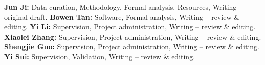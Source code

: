 \documentclass[pdflatex,iicol,sn-apa]{sn-jnl}
\theoremstyle{remark}
\begin{document}
\textbf{Jun Ji:} Data curation, Methodology, Formal analysis, Resources, Writing -- original draft.
\textbf{Bowen Tan:} Software, Formal analysis, Writing -- review \& editing.
\textbf{Yi Li:} Supervision, Project administration, Writing -- review \& editing.
\textbf{Xiaolei Zhang:} Supervision, Project administration, Writing -- review \& editing.
\textbf{Shengjie Guo:} Supervision, Project administration, Writing -- review \& editing.
\textbf{Yi Sui:} Supervision, Validation, Writing -- review \& editing.
\end{document}
